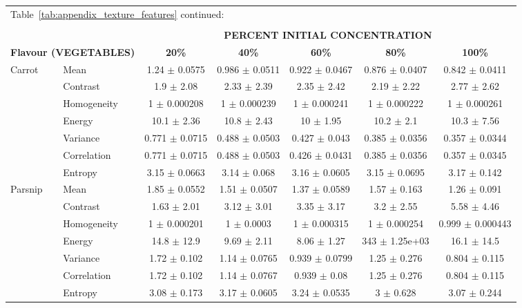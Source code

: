 \documentclass[authoryear]{elsarticle}
\begin{document}
	\begin{tabular}{llccccc}
	\multicolumn{4}{l}{Table~\ref{tab:appendix_texture_features} continued:}\\
	\multicolumn{4}{c}{}\\
	\toprule
    \multicolumn{1}{r}{} & & \multicolumn{5}{c}{\textbf{PERCENT INITIAL CONCENTRATION}} \\
 \multicolumn{2}{l}{\textbf{Flavour (VEGETABLES)}} & \textbf{20\%} & \textbf{40\%} & \textbf{60\%} & \textbf{80\%} & \textbf{100\%} \\
	\midrule
Carrot & Mean & 1.24 $\pm$ 0.0575 & 0.986 $\pm$ 0.0511 & 0.922 $\pm$ 0.0467 & 0.876 $\pm$ 0.0407 & 0.842 $\pm$ 0.0411 \\
& Contrast & 1.9 $\pm$ 2.08 & 2.33 $\pm$ 2.39 & 2.35 $\pm$ 2.42 & 2.19 $\pm$ 2.22 & 2.77 $\pm$ 2.62 \\
& Homogeneity & 1 $\pm$ 0.000208 & 1 $\pm$ 0.000239 & 1 $\pm$ 0.000241 & 1 $\pm$ 0.000222 & 1 $\pm$ 0.000261 \\
& Energy & 10.1 $\pm$ 2.36 & 10.8 $\pm$ 2.43 & 10 $\pm$ 1.95 & 10.2 $\pm$ 2.1 & 10.3 $\pm$ 7.56 \\
& Variance & 0.771 $\pm$ 0.0715 & 0.488 $\pm$ 0.0503 & 0.427 $\pm$ 0.043 & 0.385 $\pm$ 0.0356 & 0.357 $\pm$ 0.0344 \\
& Correlation & 0.771 $\pm$ 0.0715 & 0.488 $\pm$ 0.0503 & 0.426 $\pm$ 0.0431 & 0.385 $\pm$ 0.0356 & 0.357 $\pm$ 0.0345 \\
& Entropy & 3.15 $\pm$ 0.0663 & 3.14 $\pm$ 0.068 & 3.16 $\pm$ 0.0605 & 3.15 $\pm$ 0.0695 & 3.17 $\pm$ 0.142 \\
    \midrule
Parsnip & Mean & 1.85 $\pm$ 0.0552 & 1.51 $\pm$ 0.0507 & 1.37 $\pm$ 0.0589 & 1.57 $\pm$ 0.163 & 1.26 $\pm$ 0.091 \\
& Contrast & 1.63 $\pm$ 2.01 & 3.12 $\pm$ 3.01 & 3.35 $\pm$ 3.17 & 3.2 $\pm$ 2.55 & 5.58 $\pm$ 4.46 \\
& Homogeneity & 1 $\pm$ 0.000201 & 1 $\pm$ 0.0003 & 1 $\pm$ 0.000315 & 1 $\pm$ 0.000254 & 0.999 $\pm$ 0.000443 \\
& Energy & 14.8 $\pm$ 12.9 & 9.69 $\pm$ 2.11 & 8.06 $\pm$ 1.27 & 343 $\pm$ 1.25e+03 & 16.1 $\pm$ 14.5 \\
& Variance & 1.72 $\pm$ 0.102 & 1.14 $\pm$ 0.0765 & 0.939 $\pm$ 0.0799 & 1.25 $\pm$ 0.276 & 0.804 $\pm$ 0.115 \\
& Correlation & 1.72 $\pm$ 0.102 & 1.14 $\pm$ 0.0767 & 0.939 $\pm$ 0.08 & 1.25 $\pm$ 0.276 & 0.804 $\pm$ 0.115 \\
& Entropy & 3.08 $\pm$ 0.173 & 3.17 $\pm$ 0.0605 & 3.24 $\pm$ 0.0535 & 3 $\pm$ 0.628 & 3.07 $\pm$ 0.244 \\

\end{tabular}
\end{document}
